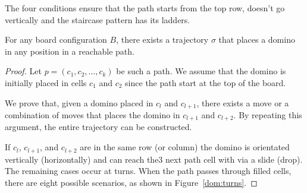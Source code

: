 The four conditions ensure that the path starts from the top row, doesn't go vertically and the staircase pattern has its ladders.

\begin{lemma0} \label{lem:path}
For any board configuration \( B \), there exists a trajectory $\sigma$ that places a domino in any position in a reachable path. 
\end{lemma0}


\begin{proof}
  Let \( p = (c_1, c_2, \dots, c_k) \) be such a path. We assume that the domino is initially placed in cells \( c_1 \) and \( c_2 \) since the path start at the top of the board.

  We prove that, given a domino placed in \( c_l \) and \( c_{l+1} \), there exists a move or a combination of moves that places the domino in \( c_{l+1} \) and \( c_{l+2} \). By repeating this argument, the entire trajectory can be constructed.

  If \( c_l \), \( c_{l+1} \), and \( c_{l+2} \) are in the same row (or column) the domino is orientated vertically (horizontally) and can reach the3 next path cell with via a slide (drop). The remaining cases occur at turns. When the path passes through filled cells, there are eight possible scenarios, as shown in Figure~\ref{dom:turns}.


\end{proof}
